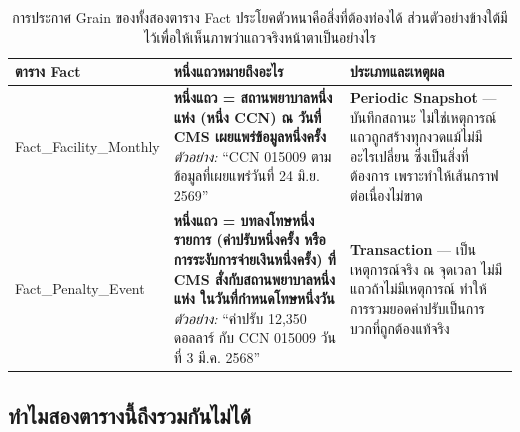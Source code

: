 \documentclass[11pt,a4paper]{article}
\newcommand{\sansall}{\sffamily}
\begin{document}
\begin{table}[H]\centering
\begin{adjustbox}{max width=\linewidth}
\small
\begin{tabular}{L{4.0cm} L{7.0cm} L{6.4cm}}
\toprule
\sansall\bfseries ตาราง Fact & \sansall\bfseries หนึ่งแถวหมายถึงอะไร &
\sansall\bfseries ประเภทและเหตุผล \\
\midrule
Fact\_Facility\_Monthly &
  \textbf{หนึ่งแถว = สถานพยาบาลหนึ่งแห่ง (หนึ่ง CCN) ณ วันที่ CMS เผยแพร่ข้อมูลหนึ่งครั้ง}
  \newline\emph{ตัวอย่าง:} ``CCN 015009 ตามข้อมูลที่เผยแพร่วันที่ 24 มิ.ย. 2569'' &
  \textbf{Periodic Snapshot} --- บันทึกสถานะ ไม่ใช่เหตุการณ์
  แถวถูกสร้างทุกงวดแม้ไม่มีอะไรเปลี่ยน ซึ่งเป็นสิ่งที่ต้องการ
  เพราะทำให้เส้นกราฟต่อเนื่องไม่ขาด \\
\addlinespace
Fact\_Penalty\_Event &
  \textbf{หนึ่งแถว = บทลงโทษหนึ่งรายการ (ค่าปรับหนึ่งครั้ง หรือการระงับการจ่ายเงินหนึ่งครั้ง)
  ที่ CMS สั่งกับสถานพยาบาลหนึ่งแห่ง ในวันที่กำหนดโทษหนึ่งวัน}
  \newline\emph{ตัวอย่าง:} ``ค่าปรับ 12,350 ดอลลาร์ กับ CCN 015009 วันที่ 3 มี.ค. 2568'' &
  \textbf{Transaction} --- เป็นเหตุการณ์จริง ณ จุดเวลา
  ไม่มีแถวถ้าไม่มีเหตุการณ์ ทำให้การรวมยอดค่าปรับเป็นการบวกที่ถูกต้องแท้จริง \\
\bottomrule
\end{tabular}
\end{adjustbox}
\caption{การประกาศ Grain ของทั้งสองตาราง Fact ประโยคตัวหนาคือสิ่งที่ต้องท่องได้ ส่วนตัวอย่างข้างใต้มีไว้เพื่อให้เห็นภาพว่าแถวจริงหน้าตาเป็นอย่างไร}
\end{table}

\subsection{ทำไมสองตารางนี้ถึงรวมกันไม่ได้}
\end{document}
